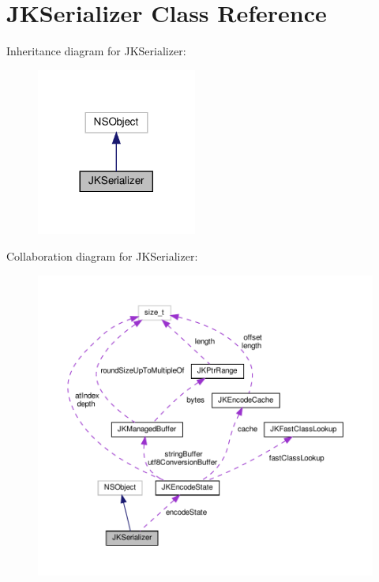 \hypertarget{interfaceJKSerializer}{}\section{J\+K\+Serializer Class Reference}
\label{interfaceJKSerializer}


Inheritance diagram for J\+K\+Serializer\+:
\nopagebreak
\begin{figure}[H]
\begin{center}
\leavevmode
\includegraphics[width=149pt]{interfaceJKSerializer__inherit__graph}
\end{center}
\end{figure}


Collaboration diagram for J\+K\+Serializer\+:
\nopagebreak
\begin{figure}[H]
\begin{center}
\leavevmode
\includegraphics[width=350pt]{interfaceJKSerializer__coll__graph}
\end{center}
\end{figure}
